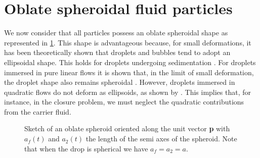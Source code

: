 \section{Oblate spheroidal fluid particles}


We now consider that all particles possess an oblate spheroidal shape as represented in \ref{fig:scheme_spheroid}. 
This shape is advantageous because, for small deformations, it has been theoretically shown that droplets and bubbles tend to adopt an ellipsoidal shape. 
This holds for droplets undergoing sedimentation \citep{taylor1964deformation}. 
For droplets immersed in pure linear flows it is shown that, in the limit of small deformation, the droplet shape also remains spheroidal \citep{leal2007advanced}. 
However, droplets immersed in quadratic flows do not deform as ellipsoids, as shown by \citet{nadim1991motion}. 
This implies that, for instance, in the closure problem, we must neglect the quadratic contributions from the carrier fluid. 
\begin{figure}[h!]
    \centering
    \hfill
    \hfill
    \caption{Sketch of an  oblate spheroid oriented along the unit vector \textbf{p} with $a_f(t)$ and $a_2(t)$ the length of the semi axes of the spheroid.
    Note that when the drop is spherical we have $a_f=a_2=a$.}
    \label{fig:scheme_spheroid}
\end{figure}


